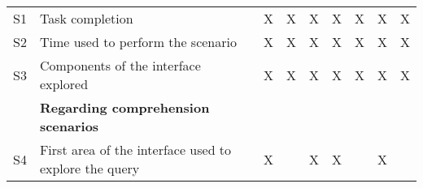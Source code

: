\begin{longtable}{@{}lm{7cm}ccccccc@{}}
    S1          & Task completion                                                                                                                                         & X                                              & X                                              & X                                              & X                                              & X                                              & X                                              & X                                              \\
    S2          & Time used to perform the scenario                                                                                                                       & X                                              & X                                              & X                                              & X                                              & X                                              & X                                              & X                                              \\
    S3 & Components of the interface explored                                                                                                          & X                                              & X                                              & X                                              & X                                              & X                                              & X                                              & X                                              \\* \midrule
                & \textbf{Regarding comprehension scenarios}                                                                                                              &                                                &                                                &                                                &                                                &                                                &                                                &                                                \\* \midrule
    S4          & First area of the interface used to explore the query                                                                                                   & X                                              &                                                & X                                              & X                                              &                                                & X                                              &                                                \\

\end{longtable}
